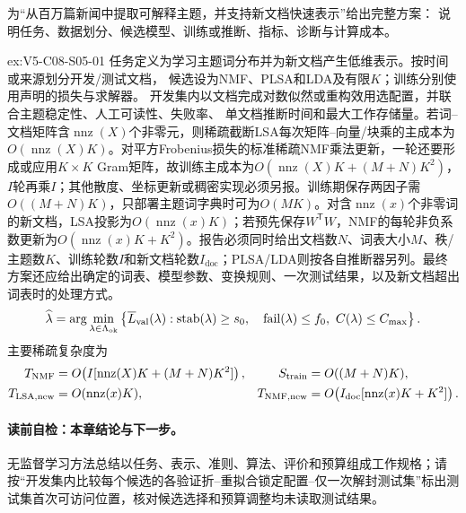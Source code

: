 \begin{SLChapterExercisePairSection}
\begin{exercise}\label{ex:V5-C08-S05-01}
为“从百万篇新闻中提取可解释主题，并支持新文档快速表示”给出完整方案：
说明任务、数据划分、候选模型、训练或推断、指标、诊断与计算成本。
\end{exercise}
\label{sol:V5-C08-S05-01}
\begin{chapterexercisesolution}{ex:V5-C08-S05-01}
任务定义为学习主题词分布并为新文档产生低维表示。按时间或来源划分开发/测试文档，
候选设为NMF、PLSA和LDA及有限$K$；训练分别使用声明的损失与求解器。
开发集内以文档完成对数似然或重构效用选配置，并联合主题稳定性、人工可读性、失败率、
单文档推断时间和最大工作存储量。若词--文档矩阵含$\operatorname{nnz}(X)$个非零元，则稀疏截断LSA每次矩阵--向量/块乘的主成本为$O(\!\operatorname{nnz}(X)K)$。对平方Frobenius损失的标准稀疏NMF乘法更新，一轮还要形成或应用$K\times K$ Gram矩阵，故训练主成本为$O\!\left(\operatorname{nnz}(X)K+(M+N)K^2\right)$，$I$轮再乘$I$；其他散度、坐标更新或稠密实现必须另报。训练期保存两因子需$O((M+N)K)$，只部署主题词字典时可为$O(MK)$。对含$\operatorname{nnz}(x)$个非零词的新文档，LSA投影为$O(\operatorname{nnz}(x)K)$；若预先保存$W^{\mathsf T}W$，NMF的每轮非负系数更新为$O(\operatorname{nnz}(x)K+K^2)$。报告必须同时给出文档数$N$、词表大小$M$、秩/主题数$K$、训练轮数$I$和新文档轮数$I_{\mathrm{doc}}$；PLSA/LDA则按各自推断器另列。最终方案还应给出确定的词表、模型参数、变换规则、一次测试结果，以及新文档超出词表时的处理方式。
\[
\widehat\lambda=\arg\min_{\lambda\in\Lambda_{\rm ok}}
\left\{\overline L_{\rm val}(\lambda):
\operatorname{stab}(\lambda)\ge s_0,\quad
\operatorname{fail}(\lambda)\le f_0,\ C(\lambda)\le C_{\max}\right\}.
\]
主要稀疏复杂度为
\[
\begin{aligned}
T_{\rm NMF}&=O\!\left(I[\operatorname{nnz}(X)K+(M+N)K^2]\right),&
S_{\rm train}&=O((M+N)K),\\
T_{\rm LSA,new}&=O(\operatorname{nnz}(x)K),&
T_{\rm NMF,new}&=O\!\left(I_{\rm doc}[\operatorname{nnz}(x)K+K^2]\right).
\end{aligned}
\]
\end{chapterexercisesolution}

\end{SLChapterExercisePairSection}

\begingroup
\normalsize
{}
\setlength{\parskip}{0.05\baselineskip}
\paragraph{读前自检：本章结论与下一步。}无监督学习方法总结以任务、表示、准则、算法、评价和预算组成工作规格；请按“开发集内比较每个候选的各验证折--重拟合锁定配置--仅一次解封测试集”标出测试集首次可访问位置，核对候选选择和预算调整均未读取测试结果。\par

